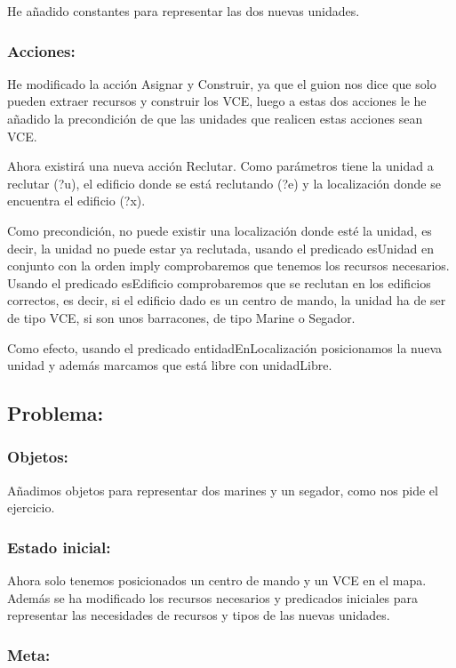 \documentclass[11pt, spanish]{article}
\begin{document}
He añadido constantes para representar las dos nuevas unidades.


\subsubsection{Acciones:}

He modificado la acción Asignar y Construir, ya que el guion nos dice que solo pueden extraer recursos y construir los VCE, luego a estas dos acciones le he añadido la precondición de que las unidades que realicen estas acciones sean VCE.


Ahora existirá una nueva acción Reclutar. Como parámetros tiene la unidad a reclutar (?u), el edificio donde se está reclutando (?e) y la localización donde se encuentra el edificio (?x).

Como precondición, no puede existir una localización donde esté la unidad, es decir, la unidad no puede estar ya reclutada, usando el predicado esUnidad en conjunto con la orden imply comprobaremos que tenemos los recursos necesarios. Usando el predicado esEdificio comprobaremos que se reclutan en los edificios correctos, es decir, si el edificio dado es un centro de mando, la unidad ha de ser de tipo VCE, si son unos barracones, de tipo Marine o Segador.

Como efecto, usando el predicado entidadEnLocalización posicionamos la nueva unidad y además marcamos que está libre con unidadLibre.


\subsection{Problema:}

\subsubsection{Objetos:}

Añadimos objetos para representar dos marines y un segador, como nos pide el ejercicio.

\subsubsection{Estado inicial:}

Ahora solo tenemos posicionados un centro de mando y un VCE en el mapa. Además se ha modificado los recursos necesarios y predicados iniciales para representar las necesidades de recursos y tipos de las nuevas unidades.

\subsubsection{Meta:}
\end{document}

